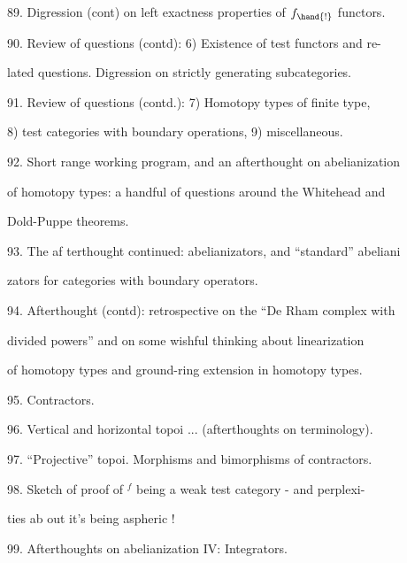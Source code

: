 89. Digression (cont) on left exactness properties of $f_{\hand{!}}$ functors.\par

90. Review of questions (contd): 6) Existence of test functors and re-\par%
lated questions.  Digression on strictly generating subcategories.\par

91. Review of questions (contd.): 7) Homotopy types of finite type,\par
8)  test categories with boundary operations,  9) miscellaneous.\par

92. Short range working program,  and an afterthought on abelianization\par
of homotopy types:  a handful of questions around the Whitehead and\par
{}Dold-Puppe theorems. \par

93. The af terthought continued: abelianizators, and ``standard'' abeliani\par
zators for categories with boundary operators.\par

94. Afterthought (contd): retrospective on the ``De Rham complex with\par
divided powers'' and on some wishful thinking about linearization\par
of homotopy types and  ground-ring extension in homotopy types.\par

\hand{[}95. Contractors.\par

96. Vertical and horizontal topoi ... (afterthoughts on terminology).\par

97. ``Projective'' topoi. Morphisms and bimorphisms of contractors.\par

98. Sketch of proof of \hand{$\Delta$}$^{f}$ being a weak test category -  and perplexi-\par%
ties ab out it's being aspheric ! \hand{]}\par

99. Afterthoughts on abelianization IV: Integrators.\par

